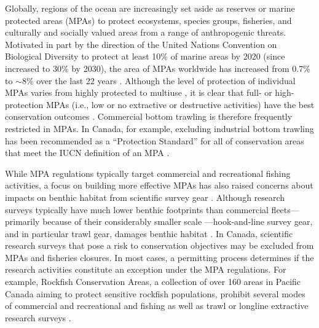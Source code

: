 \documentclass[12pt]{article}
\begin{document}
Globally, regions of the ocean are increasingly set aside as reserves or marine protected areas (MPAs) to protect ecosystems, species groups, fisheries, and culturally and socially valued areas from a range of anthropogenic threats. Motivated in part by the direction of the United Nations Convention on Biological Diversity to protect at least 10\% of marine areas by 2020 (since increased to 30\% by 2030), the area of MPAs worldwide has increased from 0.7\% to $\sim$8\% over the last 22 years \citep{WDPA2022}. Although the level of protection of individual MPAs varies from highly protected to multiuse \citep{hortaecosta2016, grorud-colvert2021}, it is clear that full- or high-protection MPAs (i.e., low or no extractive or destructive activities) have the best conservation outcomes \citep[e.g.,][]{lester2008, sciberras2015, edgar2014, zupan2018}. Commercial bottom trawling is therefore frequently restricted in MPAs. In Canada, for example, excluding industrial bottom trawling has been recommended as a ``Protection Standard'' for all of conservation areas that meet the IUCN definition of an MPA \citep{dfo2022standards}.

While MPA regulations typically target commercial and recreational fishing activities, a focus on building more effective MPAs has also raised concerns about impacts on benthic habitat from scientific survey gear \citep{field2006, ursgroup2016, saarman2018, benoit2020national}. Although research surveys typically have much lower benthic footprints than commercial fleets---primarily because of their considerably smaller scale \citep{benoit2020national}---hook-and-line survey gear, and in particular trawl gear, damages benthic habitat \citep[e.g.,][]{collie2000a, kaiser2006, hiddink2017}. In Canada, scientific research surveys that pose a risk to conservation objectives may be excluded from MPAs and fisheries closures. In most cases, a permitting process determines if the research activities constitute an exception under the MPA regulations. For example, Rockfish Conservation Areas, a collection of over 160 areas in Pacific Canada aiming to protect sensitive rockfish populations, prohibit several modes of commercial and recreational and fishing as well as trawl or longline extractive research surveys \citep{thornborough2020}.
\end{document}
